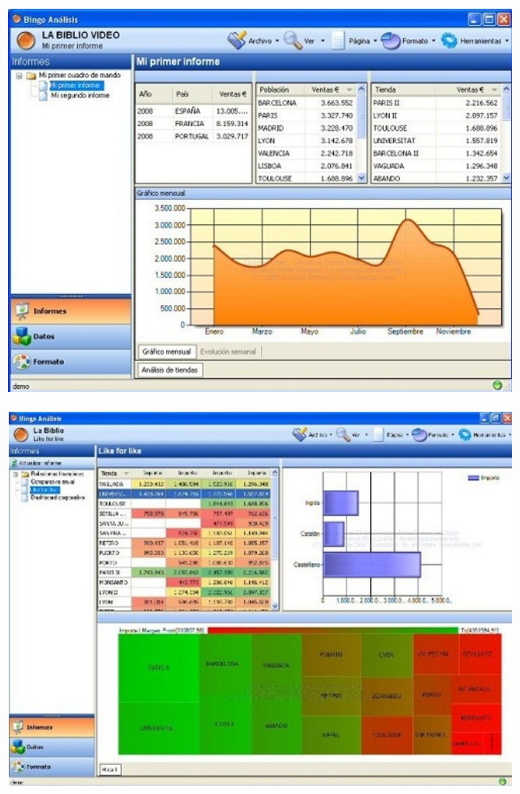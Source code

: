 \begin{center}
\includegraphics[scale=0.60]{./Imagenes/img3.png}
\end{center}

\begin{center}
\includegraphics[scale=0.60]{./Imagenes/img4.png}
\end{center}

